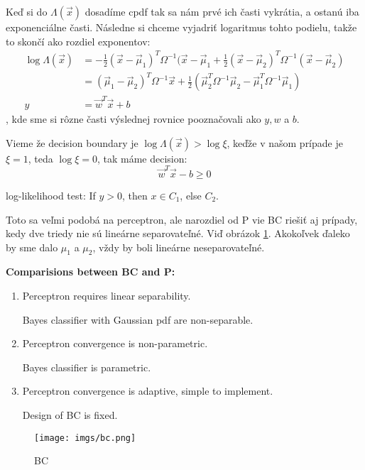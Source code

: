 \documentclass{article}
\numberwithin{equation}{section} %
\begin{document}
Keď si do $\Lambda(\overrightarrow{x})$ dosadíme cpdf tak sa nám prvé ich časti vykrátia, a ostanú iba exponenciálne časti. Následne si chceme vyjadriť logaritmus tohto podielu, takže to skončí ako rozdiel exponentov:
\begin{align*}
\log \Lambda(\overrightarrow{x}) &= -\frac{1}{2}(\overrightarrow{x}-\overrightarrow{\mu}_1)^T\Omega^{-1}(\overrightarrow{x}-\overrightarrow{\mu}_1 + \frac{1}{2}(\overrightarrow{x}-\overrightarrow{\mu}_2)^T\Omega^{-1}(\overrightarrow{x}-\overrightarrow{\mu}_2) \\
&= (\overrightarrow{\mu}_1 - \overrightarrow{\mu}_2)^T\Omega^{-1}\overrightarrow{x} + \frac{1}{2}(\overrightarrow{\mu}_2^T\Omega^{-1}\overrightarrow{\mu}_2 - \overrightarrow{\mu}_1^T\Omega^{-1}\overrightarrow{\mu}_1)\\
y &= \overrightarrow{w}^T\overrightarrow{x} + b
\end{align*}
, kde sme si rôzne časti výslednej rovnice pooznačovali ako $y, w$ a $b$.

Vieme že decision boundary je $\log \Lambda(\overrightarrow{x}) > \log \xi$, keďže v našom prípade je $\xi = 1$, teda $\log \xi = 0$, tak máme decision:
$$\overrightarrow{w}^T\overrightarrow{x} - b \geq 0$$

log-likelihood test:  If  $y > 0$, then $x \in C_1$, else $C_2$.

Toto sa veľmi podobá na perceptron, ale narozdiel od P vie BC riešiť aj prípady, kedy dve triedy nie sú lineárne separovateľné. Viď obrázok \ref{fig:bc}. Akokoľvek ďaleko by sme dalo $\mu_1$ a $\mu_2$, vždy by boli lineárne neseparovateľné.

\textbf{Comparisions between BC and P:}
\begin{enumerate}
\item Perceptron requires linear separability. 

Bayes classifier with Gaussian pdf are non-separable.
\item Perceptron convergence is non-parametric. 

Bayes classifier is parametric.
\item Perceptron convergence is adaptive, simple to implement.

Design of BC is fixed.
\end{enumerate}

\begin{figure}[H]
\texttt{[image: imgs/bc.png]}
\centering
\caption{BC} \label{fig:bc}
\end{figure}
\end{document}
